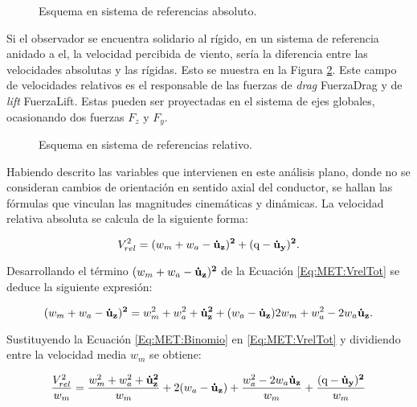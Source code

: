 \begin{figure}[htbp]
	\centering
	\def\svgwidth{60mm}
	
	\caption{Esquema en sistema de referencias absoluto.}
	\label{fig:MET:Viento:VelAbs}
\end{figure}

Si el observador se encuentra solidario al rígido, en un sistema de referencia anidado a el, la velocidad percibida de viento, sería la diferencia entre las velocidades absolutas y las rígidas. Esto se muestra en la Figura \ref{fig:MET:Viento:VelRel}. Este campo de velocidades relativos es el responsable de las fuerzas de \textit{drag} \gls{FuerzaDrag} y  de \textit{lift} \gls{FuerzaLift}. Estas pueden ser proyectadas en el sistema de ejes globales, ocasionando dos fuerzas $F_z$ y $F_y$.


\begin{figure}[htbp]
	\centering
	\def\svgwidth{80mm}
	
	\caption{Esquema en sistema de referencias relativo.}
	\label{fig:MET:Viento:VelRel}
\end{figure}

Habiendo descrito las variables que intervienen en este análisis plano, donde no se consideran cambios de orientación en sentido axial del conductor, se hallan las fórmulas que vinculan las magnitudes cinemáticas y dinámicas. La velocidad relativa absoluta se calcula de la siguiente forma:

\begin{equation}
	\label{Eq:MET:VrelTot}
	V_{rel}^2=(w_m+w_a-\bf{\dot{u}}_{z})^2+(\text{q}-\bf{\dot{u}}_{y})^2.
\end{equation}

Desarrollando el término $(w_m+w_a-\bf{\dot{u}}_{z})^2$ de la Ecuación \eqref{Eq:MET:VrelTot} se deduce la siguiente expresión:

\begin{equation}
	\label{Eq:MET:Binomio}
	(w_m+w_a-\bf{\dot{u}}_{z})^2= \text{$w_m^2+w_a^2$} + \bf{\dot{u}}_{z}^2 +  (\text{$w_a $} - \bf{\dot{u}}_{z})\text{$2w_m $}  +\text{$w_a^2$}- \text{$2w_a $} \bf{\dot{u}}_{z}. 
\end{equation}

Sustituyendo la Ecuación \eqref{Eq:MET:Binomio} en \eqref{Eq:MET:VrelTot} y dividiendo entre la velocidad media $w_m$ se obtiene:

\begin{equation}
	\label{Eq:MET:Binomio}
	\frac{V_{rel}^2}{w_m}=\frac{\text{$w_m^2+w_a^2$} + \bf{\dot{u}}_{z}^2}{w_m}  +  2(\text{$w_a $} - \bf{\dot{u}}_{z}) + \frac{\text{$w_a^2$}- \text{$2w_a $} \bf{\dot{u}}_{z}}{\text{$w_m$}}+ \frac{(\text{q}-\bf{\dot{u}}_{y})^2 }{\text{$w_m$}}
\end{equation}


